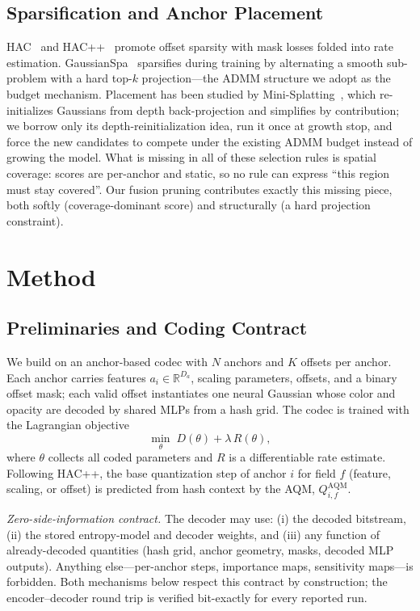 \documentclass[conference]{IEEEtran}
\begin{document}
\subsection{Sparsification and Anchor Placement}
HAC~\cite{chen2024} and HAC++~\cite{chen2025} promote offset sparsity with mask
losses folded into rate estimation. GaussianSpa~\cite{zhang2025gaussianspa}
sparsifies during training by alternating a smooth sub-problem with a hard top-$k$
projection---the ADMM structure we adopt as the budget mechanism. Placement has
been studied by Mini-Splatting~\cite{fang2024}, which re-initializes Gaussians from
depth back-projection and simplifies by contribution; we borrow only its
depth-reinitialization idea, run it once at growth stop, and force the new
candidates to compete under the existing ADMM budget instead of growing the model.
What is missing in all of these selection rules is spatial coverage: scores are
per-anchor and static, so no rule can express ``this region must stay covered''.
Our fusion pruning contributes exactly this missing piece, both softly
(coverage-dominant score) and structurally (a hard projection constraint).

\section{Method}

\subsection{Preliminaries and Coding Contract}
We build on an anchor-based codec with $N$ anchors and $K$ offsets per anchor. Each
anchor carries features $a_i\in\mathbb{R}^{D_a}$, scaling parameters, offsets, and a
binary offset mask; each valid offset instantiates one neural Gaussian whose color
and opacity are decoded by shared MLPs from a hash grid. The codec is trained with
the Lagrangian objective
\begin{equation}
\min_{\theta}\; D(\theta) + \lambda\, R(\theta),
\label{eq:rd}
\end{equation}
where $\theta$ collects all coded parameters and $R$ is a differentiable rate
estimate. Following HAC++, the base quantization step of anchor $i$ for field $f$
(feature, scaling, or offset) is predicted from hash context by the AQM,
$Q^{\mathrm{AQM}}_{i,f}$.

\emph{Zero-side-information contract.} The decoder may use: (i) the decoded
bitstream, (ii) the stored entropy-model and decoder weights, and (iii) any function
of already-decoded quantities (hash grid, anchor geometry, masks, decoded MLP
outputs). Anything else---per-anchor steps, importance maps, sensitivity
maps---is forbidden. Both mechanisms below respect this contract by construction;
the encoder--decoder round trip is verified bit-exactly for every reported run.
\end{document}
